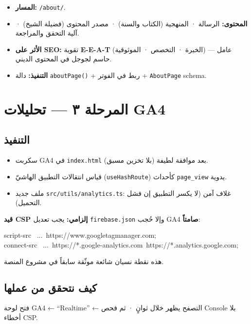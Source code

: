 \documentclass[11pt]{article}
\begin{document}
\begin{itemize}
  \item \textbf{المسار:} \texttt{/about/}.
  \item \textbf{المحتوى:} الرسالة · المنهجية (الكتاب والسنة) · مصدر المحتوى (فضيلة الشيخ) · آلية التحقق والمراجعة.
  \item \textbf{الأثر على SEO:} تقوية \textbf{E-E-A-T} (الخبرة · التخصص · الموثوقية) — عامل حاسم لجوجل في المحتوى الديني.
  \item \textbf{التنفيذ:} دالة \texttt{aboutPage()} + ربط في الفوتر + \texttt{AboutPage} schema.
\end{itemize}

\section{المرحلة ٣ — تحليلات GA4}

\subsection*{التنفيذ}
\begin{itemize}
  \item سكربت GA4 في \texttt{index.html} بعد موافقة لطيفة (بلا تخزين مسبق).
  \item قياس انتقالات التطبيق الهاشيّ (\texttt{useHashRoute}) كأحداث \texttt{page\_view} يدوية.
  \item ملف جديد \texttt{src/utils/analytics.ts}: غلاف آمن (لا يكسر التطبيق إن فشل التحميل).
\end{itemize}

\begin{warnbox}
\textbf{قيد CSP إلزامي:} يجب تعديل \texttt{firebase.json} وإلا حُجب GA4 \textbf{صامتاً}:
\begin{codebox}
{\ttfamily\small\raggedleft
script-src \ ...\ https://www.googletagmanager.com;\\
connect-src \ ...\ https://*.google-analytics.com\ https://*.analytics.google.com;
}
\end{codebox}
هذه نقطة نسيان شائعة موثّقة سابقاً في مشروع المنصة.
\end{warnbox}

\subsection*{كيف نتحقق من عملها}
فتح لوحة GA4 ← ``Realtime'' ← التصفح يظهر خلال ثوانٍ · ثم فحص Console بلا أخطاء CSP.
\end{document}
